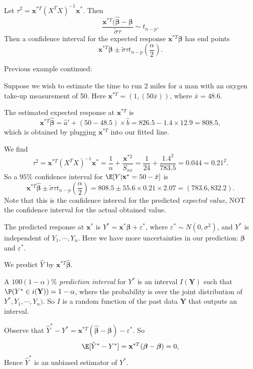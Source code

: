 \documentclass[a4paper]{article}
\begin{document}
Let $\tau^2 = \mathbf{x}^{*T} (X^TX)^{-1}\mathbf{x}^*$. Then
\[
  \frac{\mathbf{x}^{*T}(\hat{\boldsymbol\beta} - \boldsymbol\beta}{\tilde{\sigma}\tau}\sim t_{n - p}.
\]
Then a confidence interval for the expected response $\mathbf{x}^{*T}\boldsymbol\beta$ has end points
\[
  \mathbf{x}^{*T}\boldsymbol\beta \pm \tilde{\sigma}\tau t_{n - p}\left(\frac{\alpha}{2}\right).
\]
\begin{eg}
  Previous example continued:

  Suppose we wish to estimate the time to run 2 miles for a man with an oxygen take-up measurement of 50. Here $\mathbf{x}^{*T} = (1, (5 0 \bar x))$, where $\bar x = 48.6$.

  The estimated expected response at $\mathbf{x}^{*T}$ is
  \[
    \mathbf{x}^{*T}\hat{\boldsymbol\beta} = \hat{a}' + (50 - 48.5)\times \hat{b} = 826.5 - 1.4\times 12.9 = 808.5,
  \]
  which is obtained by plugging $\mathbf{x}^{*T}$ into our fitted line.

  We find
  \[
    \tau^2 = \mathbf{x}^{*T}(X^TX)^{-1}\mathbf{x}^* = \frac{1}{n} + \frac{\mathbf{x}^{*2}}{S_{xx}} = \frac{1}{24} + \frac{1.4^2}{783.5} = 0.044 = 0.21^2.
  \]
  So a $95\%$ confidence interval for $\E[Y|\mathbf{x}^* = 50 - \bar x]$ is
  \[
    \mathbf{x}^{*T}\hat{\boldsymbol\beta}\pm \tilde{\sigma}\tau t_{n - p}\left(\frac{\alpha}{2}\right) = 808.5 \pm 55.6 \times 0.21 \times 2.07 = (783.6, 832.2).
  \]
  Note that this is the confidence interval for the predicted \emph{expected value}, NOT the confidence interval for the actual obtained value.
\end{eg}
The predicted response at $\mathbf{x}^*$ is $Y^* = \mathbf{x}^*\boldsymbol\beta + \varepsilon^*$, where $\varepsilon^*\sim N(0, \sigma^2)$, and $Y^*$ is independent of $Y_1, \cdots, Y_n$. Here we have more uncertainties in our prediction: $\boldsymbol\beta$ and $\varepsilon^*$.

We predict $\hat{Y}$ by $\mathbf{x}^{*T}\hat{\boldsymbol\beta}$.

A $100(1 - \alpha)\%$ \emph{prediction interval} for $Y^*$ is an interval $I(\mathbf{Y})$ such that $\P(Y^*\in i(\mathbf{Y})) = 1 - \alpha$, where the probability is over the joint distribution of $Y^*, Y_1, \cdots, Y_n)$. So $I$ is a random function of the past data $\mathbf{Y}$ that outputs an interval.

Observe that $\hat{Y}^* - Y^* = \mathbf{x}^{*T}(\hat{\boldsymbol\beta} - \boldsymbol\beta) - \varepsilon^*$. So
\[
  \E[\hat{Y}^* - Y^*] = \mathbf{x}^{*T}(\boldsymbol\beta - \boldsymbol\beta) = 0,
\]
Hence $\hat{Y}^*$ is an unbiased estimator of $Y^*$.
\end{document}
